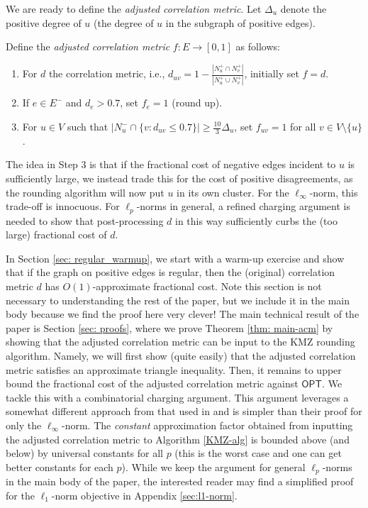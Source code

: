 We are ready to define the \emph{adjusted correlation metric}. 
Let $\Delta_u$ denote the positive degree of $u$ (the degree of $u$ in the subgraph of positive edges).
\begin{definition} \label{def: adj_corr_metric}
    Define the \emph{adjusted correlation metric} $f: E \rightarrow [0,1]$ as follows:
    \begin{enumerate}
        \item For $d$ the correlation metric, i.e., 
        $d_{uv} = 1 - \frac{|N_u^+ \cap N_v^+|}{|N_u^+ \cup N_v^+|}$, initially set $f = d$. 
        \item If $e \in E^-$ and $d_e > 0.7$, set $f_e = 1$ (round up). 
        \item For $u \in V$ such that $|N_u^- \cap \{v: d_{uv} \leq 0.7\}| \geq \frac{10}{3}\Delta_u $, set $f_{uv}=1$ for all $v \in V \setminus \{u\}$.
    \end{enumerate}
\end{definition}

The idea in Step 3 is that if the fractional cost of negative edges incident to $u$ is sufficiently large, we instead trade this for the cost of positive disagreements, as 
the rounding algorithm will now put $u$ in its own cluster.
For the $\ell_\infty$-norm, this trade-off is innocuous.
For $\ell_p$-norms in general, a refined charging argument is needed to show that post-processing $d$ in this way sufficiently curbs the (too large) fractional cost of $d$.

In Section \ref{sec: regular_warmup}, we start with a warm-up exercise 
and show that if the graph on positive edges is regular, then 
the (original) correlation metric $d$ has $O(1)$-approximate fractional cost.
Note this section is not necessary to understanding the rest of the paper, 
but we include it in the main body because we find the proof here very clever!
The main technical result of the paper is Section \ref{sec: proofs}, where we prove Theorem \ref{thm: main-acm} 
by showing that the adjusted correlation metric can be input to the KMZ rounding algorithm.
Namely, we will first show (quite easily) that the adjusted correlation metric satisfies an approximate triangle inequality.
Then, it remains to upper bound the fractional cost of the adjusted correlation metric against $\textsf{OPT}$.
We tackle this with a combinatorial charging argument.   This argument leverages a somewhat different approach from that used in \cite{DMN23} and is simpler than their proof for only the $\ell_\infty$-norm.
The \textit{constant} approximation factor obtained from inputting the adjusted correlation metric to Algorithm \ref{KMZ-alg} is bounded above (and below) by universal constants for all $p$ (this is the worst case and one can get better constants for each $p$).
While we keep the argument for general $\ell_p$-norms in the main body of the paper,
the interested reader may find a simplified proof for the $\ell_1$-norm objective in Appendix \ref{sec:l1-norm}.



